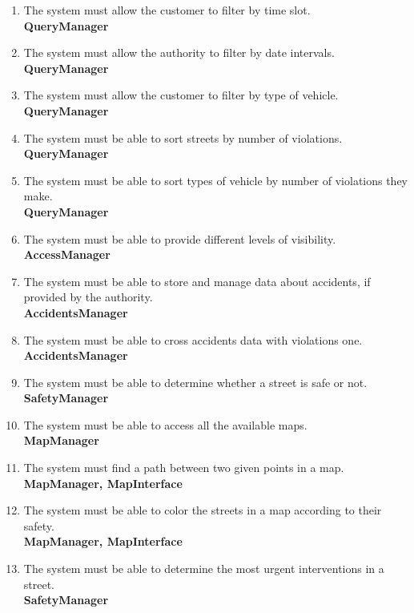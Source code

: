 \begin{enumerate}[label=\textbf{R\arabic*}]
		\item \label{req:timeFilter} The system must allow the customer to filter by time slot.\\
		\textbf{QueryManager}
		\item \label{req:dateFilter} The system must allow the authority to filter by date intervals.\\
		\textbf{QueryManager}
		\item \label{req:vehicleFilter} The system must allow the customer to filter by type of vehicle.\\
		\textbf{QueryManager}
		\item \label{req:sortedResult} The system must be able to sort streets by number of violations.\\
		\textbf{QueryManager}
		\item \label{req:sortedVehicles} The system must be able to sort types of vehicle by number of violations they make.\\
		\textbf{QueryManager}
		\item \label{req:visibility} The system must be able to provide different levels of visibility.\\
		\textbf{AccessManager}
		\item \label{req:accidentsData} The system must be able to store and manage data about accidents, if provided by the authority.\\
		\textbf{AccidentsManager}
		\item \label{req:crossData} The system must be able to cross accidents data with violations one.\\
		\textbf{AccidentsManager}
		\item \label{req:safeStreet} The system must be able to determine whether a street is safe or not.\\
		\textbf{SafetyManager}
		\item \label{req:cityStreets} The system must be able to access all the available maps.\\
		\textbf{MapManager}
		\item \label{req:pathFinder} The system must find a path between two given points in a map.\\
		\textbf{MapManager, MapInterface}
		\item \label{req:colorMap} The system must be able to color the streets in a map according to their safety.\\
		\textbf{MapManager, MapInterface}
		\item \label{req:interventions} The system must be able to determine the most urgent interventions in a street.	\\
		\textbf{SafetyManager}
	\end{enumerate}